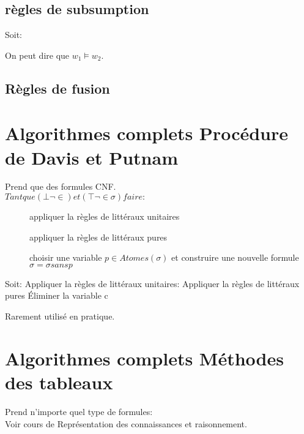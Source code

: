 
\subsection{règles de subsumption}

Soit:

On peut dire que $w_1 \models w_2$.

\subsection{Règles de fusion}


\section{Algorithmes complets Procédure de Davis et Putnam}

Prend que des formules CNF.\\

$Tant que(\bot \neg \in) et (\top \neg \in \sigma) faire:$
\begin{description}
\item[] appliquer la règles de littéraux unitaires
\item[] appliquer la règles de littéraux pures
\item[] choisir une variable $p \in Atomes(\sigma)$ et construire une nouvelle formule $\sigma = \sigma sans p$
\end{description}

Soit:
Appliquer la règles de littéraux unitaires:
Appliquer la règles de littéraux pures
Éliminer la variable c

Rarement utilisé en pratique.

\section{Algorithmes complets Méthodes des tableaux}

Prend n'importe quel type de formules:\\
Voir cours de Représentation des connaissances et raisonnement.\\

